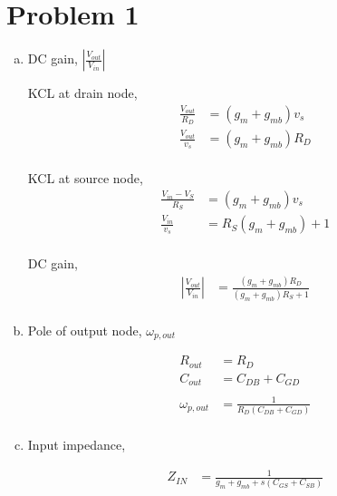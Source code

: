 \documentclass{article}
\begin{document}
\section{Problem 1}
\label{sec:org735a64e}
\begin{enumerate}[(a)]
\item DC gain, \(|\frac{V_{out}}{V_{in}}|\)

KCL at drain node,
\begin{equation*}
\begin{aligned}
\frac{V_{out}}{R_{D}} &= (g_{m} + g_{mb})v_{s} \\
\frac{V_{out}}{v_{s}} &= (g_{m} + g_{mb})R_{D} \\
\end{aligned}
\end{equation*}

KCL at source node,
\begin{equation*}
\begin{aligned}
\frac{V_{in} - V_{S}}{R_{S}} &= (g_{m} + g_{mb})v_{s} \\
\frac{V_{in}}{v_{s}} &= R_{S}(g_{m} + g_{mb}) + 1 \\
\end{aligned}
\end{equation*}

DC gain,
\begin{equation*}
\begin{aligned}
|\frac{V_{out}}{V_{in}}| &= \frac{(g_{m} + g_{mb})R_{D}}{(g_{m} + g_{mb})R_{S} + 1} \\
\end{aligned}
\end{equation*}

\item Pole of output node, \(\omega_{p,out}\)

\begin{equation*}
\begin{aligned}
R_{out} &= R_{D} \\
C_{out} &= C_{DB} + C_{GD} \\
\\
\omega_{p,out} &= \frac{1}{R_{D}(C_{DB} + C_{GD})} \\
\end{aligned}
\end{equation*}

\item Input impedance,

\begin{equation*}
\begin{aligned}
Z_{IN} &= \frac{1}{g_{m} + g_{mb} + s(C_{GS} + C_{SB})} \\
\end{aligned}
\end{equation*}


\end{enumerate}
\end{document}
